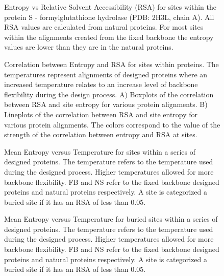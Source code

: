 \documentclass[12pt]{article}
\begin{document}
\begin{figure}[H]
\caption{Entropy vs Relative Solvent Accessibility (RSA) for sites within the protein S - formylglutathione hydrolase (PDB: 2H3L, chain A). All RSA values are calculated from natural proteins. For most sites within the alignments created from the fixed backbone the entropy values are lower than they are in the natural proteins.}
\label{Entropy_Sites_Noah}
\end{figure}


\begin{figure}[H]
\caption{Correlation between Entropy and RSA for sites within proteins.  The temperatures represent alignments of designed proteins where an increased temperature relates to an increase level of backbone flexibility during the design process. A) Boxplots of the correlation between RSA and site entropy for various protein alignments. B) Lineplots of the correlation between RSA and site entropy for various protein alignments. The colors correspond to the value of the strength of the correlation between entropy and RSA at sites. }
\label{NoahStructureFig1}
\end{figure}

\begin{figure}[H]
\caption{Mean Entropy versus Temperature for sites within a series of designed proteins. The temperature refers to the temperature used during the designed process. Higher temperatures allowed for more backbone flexibility. FB and NS refer to the fixed backbone designed proteins and natural proteins respectively.  A site is categorized a buried site if it has an RSA of less than 0.05.}
\label{Mean_Entropy_Noah}
\end{figure}

\begin{figure}[H]
\caption{Mean Entropy versus Temperature for buried sites within a series of designed proteins. The temperature refers to the temperature used during the designed process. Higher temperatures allowed for more backbone flexibility. FB and NS refer to the fixed backbone designed proteins and natural proteins respectively.  A site is categorized a buried site if it has an RSA of less than 0.05.}
\label{Buried_Entropy_Noah}
\end{figure}
\end{document}
